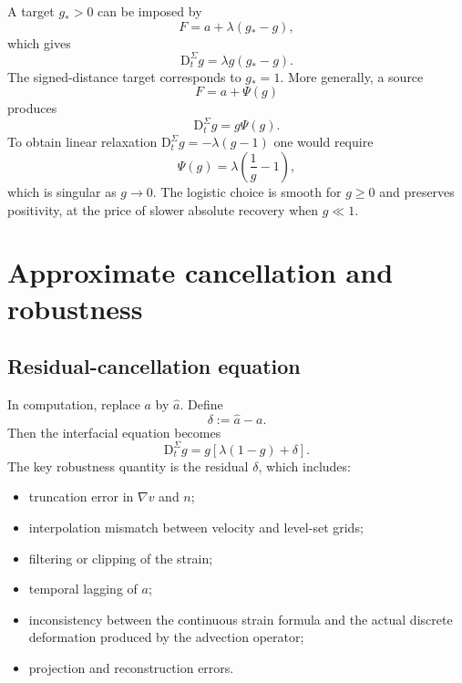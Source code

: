 \documentclass[11pt,a4paper]{article}
\theoremstyle{definition}
\theoremstyle{remark}
\newcommand{\material}{\mathrm{D}_t}
\begin{document}
A target $g_*>0$ can be imposed by
\begin{equation}
  F=a+\lambda(g_*-g),
\end{equation}
which gives
\begin{equation}
  \material^{\Sigma}g=\lambda g(g_*-g).
\end{equation}
The signed-distance target corresponds to $g_*=1$. More generally, a source
\begin{equation}
  F=a+\Psi(g)
\end{equation}
produces
\begin{equation}
  \material^{\Sigma}g=g\Psi(g).
\end{equation}
To obtain linear relaxation $\material^{\Sigma}g=-\lambda(g-1)$ one would require
\begin{equation}
  \Psi(g)=\lambda\left(\frac1g-1\right),
\end{equation}
which is singular as $g\to0$. The logistic choice is smooth for $g\ge0$ and preserves positivity, at the price of slower absolute recovery when $g\ll1$.

\section{Approximate cancellation and robustness}

\subsection{Residual-cancellation equation}

In computation, replace $a$ by $\widehat a$. Define
\begin{equation}
  \delta:=\widehat a-a.
  \label{eq:delta}
\end{equation}
Then the interfacial equation becomes
\begin{equation}
  \boxed{
  \material^{\Sigma}g=g\left[\lambda(1-g)+\delta\right].
  }
  \label{eq:perturbed-logistic}
\end{equation}
The key robustness quantity is the residual $\delta$, which includes:
\begin{itemize}
  \item truncation error in $\nabla v$ and $n$;
  \item interpolation mismatch between velocity and level-set grids;
  \item filtering or clipping of the strain;
  \item temporal lagging of $a$;
  \item inconsistency between the continuous strain formula and the actual discrete deformation produced by the advection operator;
  \item projection and reconstruction errors.
\end{itemize}
\end{document}
